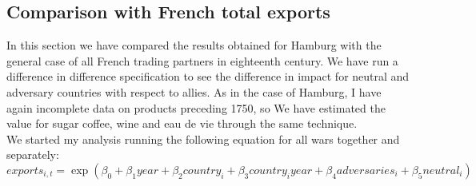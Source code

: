 \documentclass[12pt,a4paper,titlepage,english]{article}
\begin{document}
\subsection{Comparison with French total exports}
In this section we have compared the results obtained for Hamburg with the general case of all French trading partners in eighteenth century. We have run a difference in difference specification to see the difference in impact for neutral and adversary countries with respect to allies. As in the case of Hamburg, I have again incomplete data on products preceding 1750, so We have estimated the value for sugar coffee, wine and eau de vie through the same technique. \\
We started my analysis running the following equation for all wars together and separately:
\begin{equation}
exports_{i,t}=\exp(\beta_0+\beta_1year + \beta_2country_i+\beta_3country_iyear+\beta_4adversaries_i+\beta_5neutral_i)
\end{equation}
\end{document}
